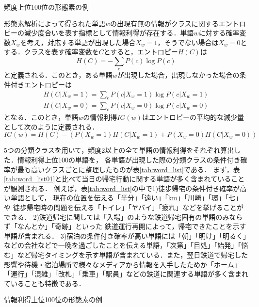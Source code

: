 \documentclass[japanese]{jnlp_1.4}
\begin{document}
\begin{table}[b]
\caption{頻度上位100位の形態素の例}
\label{tab:word_list01}

\end{table}

形態素解析によって得られた単語$w$の出現有無の情報がクラスに関するエントロピーの減少度合いを表す指標として情報利得が存在する．単語$w$に対する確率変数$X_w$を考え，対応する単語が出現した場合$X_w = 1$，そうでない場合は$X_w = 0$とする．クラスを表す確率変数を$C$とすると，エントロピー$H(C)$は
\begin{equation}
H(C) = - \sum_c P(c) \log P(c)
\end{equation}
と定義される．このとき，ある単語$w$が出現した場合，出現しなかった場合の条件付きエントロピーは
\begin{gather*}
H(C|X_w = 1) = \sum_c P(c|X_w = 1) \log P(c|X_w = 1) \\
H(C|X_w = 0) = \sum_c P(c|X_w = 0) \log P(c|X_w = 0)
\end{gather*}
となる．このとき，単語$w$の情報利得$IG(w)$はエントロピーの平均的な減少量として次のように定義される．
\begin{equation}
IG(w) = H(C) - ( P(X_w = 1) H(C|X_w = 1) +  P(X_w = 0) H(C|X_w = 0) ) 
\end{equation}

5つの分類クラスを用いて，頻度2以上の全て単語の情報利得をそれぞれ算出した．情報利得上位100の単語を，
各単語が出現した際の分類クラスの条件付き確率が最も高いクラスごとに整理したものが表\ref{tab:word_list}である．
まず，表\ref{tab:word_list01}と比べて当日の帰宅行動に関する単語が多く含まれていることが観測される．
例えば，表\ref{tab:word_list}の中で1)徒歩帰宅の条件付き確率が高い単語として，
現在の位置を伝える「半分」「遠い」「km」「川崎」「環」「七」や
徒歩帰宅時の問題を伝える「トイレ」「ヤバイ」「疲れ」などを挙げることができる．
2)鉄道帰宅に関しては「入場」のような鉄道帰宅固有の単語のみならず「なんとか」「奇跡」といった
鉄道運行再開によって，帰宅できたことを示す単語が含まれる．
3)宿泊の条件付き確率が高い単語には「朝」「明け」「明るく」などの会社などで一晩を過ごしたことを伝える単語，「次第」「目処」「始発」「悩む」など帰宅タイミングを示す単語が含まれている．また，翌日鉄道で帰宅した影響や待機・宿泊場所で様々なメディアから情報を入手したためか「ホーム」「運行」「混雑」「改札」「乗車」「駅員」などの鉄道に関連する単語が多く含まれていることも特徴である．

\begin{table}[t]
\caption{情報利得上位100位の形態素の例}
\label{tab:word_list}

\end{table}
\end{document}
